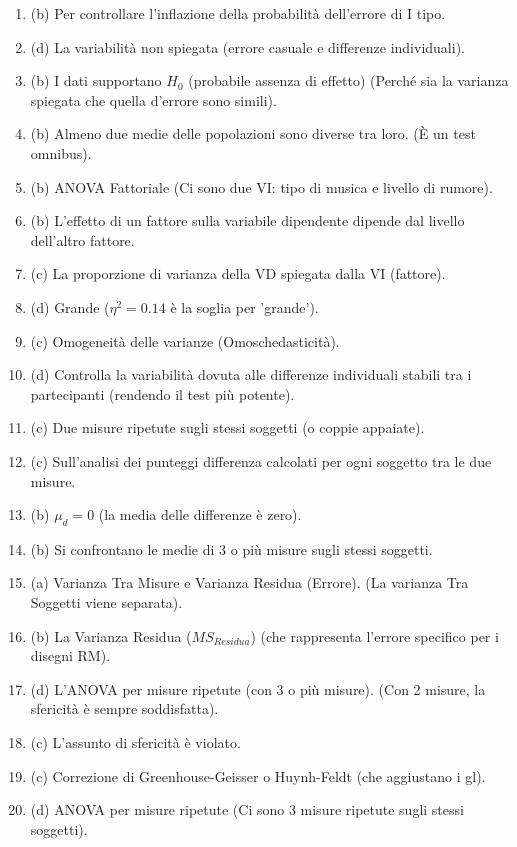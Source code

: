 \documentclass[12pt, a4paper]{article}
\newcommand{\Hnull}{H_0} %
\newcommand{\etasq}{\eta^2} %
\begin{document}
\begin{enumerate}[leftmargin=*, label=\arabic*.]
    \item (b) Per controllare l'inflazione della probabilità dell'errore di I tipo.
    \item (d) La variabilità non spiegata (errore casuale e differenze individuali).
    \item (b) I dati supportano $\Hnull$ (probabile assenza di effetto) (Perché sia la varianza spiegata che quella d'errore sono simili).
    \item (b) Almeno due medie delle popolazioni sono diverse tra loro. (È un test omnibus).
    \item (b) ANOVA Fattoriale (Ci sono due VI: tipo di musica e livello di rumore).
    \item (b) L'effetto di un fattore sulla variabile dipendente dipende dal livello dell'altro fattore.
    \item (c) La proporzione di varianza della VD spiegata dalla VI (fattore).
    \item (d) Grande ($\etasq = 0.14$ è la soglia per 'grande').
    \item (c) Omogeneità delle varianze (Omoschedasticità).
    \item (d) Controlla la variabilità dovuta alle differenze individuali stabili tra i partecipanti (rendendo il test più potente).
    \item (c) Due misure ripetute sugli stessi soggetti (o coppie appaiate).
    \item (c) Sull'analisi dei punteggi differenza calcolati per ogni soggetto tra le due misure.
    \item (b) $\mu_d = 0$ (la media delle differenze è zero).
    \item (b) Si confrontano le medie di 3 o più misure sugli stessi soggetti.
    \item (a) Varianza Tra Misure e Varianza Residua (Errore). (La varianza Tra Soggetti viene separata).
    \item (b) La Varianza Residua ($MS_{Residua}$) (che rappresenta l'errore specifico per i disegni RM).
    \item (d) L'ANOVA per misure ripetute (con 3 o più misure). (Con 2 misure, la sfericità è sempre soddisfatta).
    \item (c) L'assunto di sfericità è violato.
    \item (c) Correzione di Greenhouse-Geisser o Huynh-Feldt (che aggiustano i gl).
    \item (d) ANOVA per misure ripetute (Ci sono 3 misure ripetute sugli stessi soggetti).
\end{enumerate}
\end{document}
